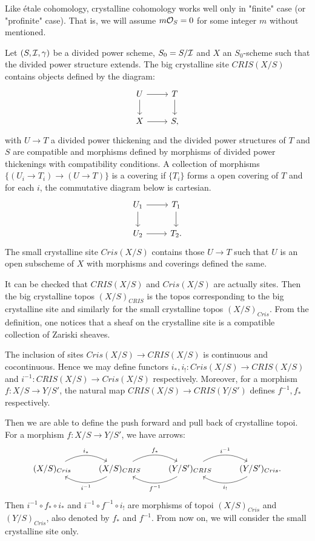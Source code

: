 Like \'etale cohomology, crystalline cohomology works well 
only in "finite" case (or "profinite" case). 
That is, we will assume $m {\mathcal {O}}_S=0$ for some integer $m$ without mentioned.
\begin{definition}
    Let $(S, {\mathcal {I}}, \gamma)$ be a divided power scheme, 
    $S_0 = S / {\mathcal {I}}$ and $X$ an $S_0$-scheme such that 
    the divided power structure extends. 
    The big crystalline site $CRIS(X/S)$ contains objects defined by the diagram:
    \[
        \begin{tikzcd}
            U \ar[r] \ar[d] & T \ar[d] \\
            X \ar[r] & S,
        \end{tikzcd}
    \]
    with $U \to T$ a divided power thickening and 
    the divided power structures of $T$ and $S$ are compatible and 
    morphisms defined by 
    morphisms of divided power thickenings with compatibility conditions. 
    A collection of morphisms $\{(U_i \to T_i) \to (U \to T)\}$ is a covering 
    if $\{T_i\}$ forms a open covering of $T$ and for each $i$, 
    the commutative diagram below is cartesian.
    \[
        \begin{tikzcd}
            U_1 \ar[r] \ar[d] & T_1 \ar[d] \\
            U_2 \ar[r] & T_2.
        \end{tikzcd}
    \]
The small crystalline site $Cris(X/S)$ contains those $U \to T$ 
such that $U$ is an open subscheme of $X$ 
with morphisms and coverings defined the same.
\end{definition}

It can be checked that $CRIS(X/S)$ and $Cris(X/S)$ are actually sites. 
Then the big crystalline topos $(X/S)_{CRIS}$ is the topos 
corresponding to the big crystalline site 
and similarly for the small crystalline topos $(X/S)_{Cris}$.
From the definition, one notices that 
a sheaf on the crystalline site is a compatible collection of Zariski sheaves.

The inclusion of sites $Cris(X/S) \to CRIS(X/S)$ is continuous and cocontinuous. 
Hence we may define functors $i_*, i_! \colon Cris(X/S) \to CRIS(X/S)$ 
and $i^{-1} \colon CRIS(X/S) \to Cris(X/S)$ respectively. 
Moreover, for a morphism $f\colon X/S \to Y/S'$, 
the natural map $CRIS(X/S)\to CRIS(Y/S')$ defines $f^{-1}, f_*$ respectively.

Then we are able to define the push forward 
and pull back of crystalline topoi. 
For a morphism $f \colon X/S \to Y/S'$, we have arrows:
\[
    \begin{tikzcd}
        (X/S)_{Cris} \ar[r, "{i_*}", bend left] & 
        (X/S)_{CRIS} \ar[l,"{i^{-1}}", bend left] \ar[r, "{f_*}", bend left] & 
        (Y/S')_{CRIS} \ar[l, "{f^{-1}}", bend left] \ar[r, "{i^{-1}}", bend left] & 
        (Y/S')_{Cris} \ar[l, "{i_!}", bend left].
    \end{tikzcd}
\]
Then $i^{-1} \circ f_* \circ i_*$ and $i^{-1} \circ f^{-1} \circ i_!$ 
are morphisms of topoi $(X/S)_{Cris}$ and $(Y/S)_{Cris}$, 
also denoted by $f_*$ and $f^{-1}$. 
From now on, we will consider the small crystalline site only.

